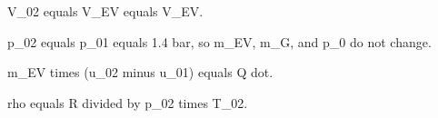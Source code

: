 V_02 equals V_EV equals V_EV.

p_02 equals p_01 equals 1.4 bar, so m_EV, m_G, and p_0 do not change.

m_EV times (u_02 minus u_01) equals Q dot.

rho equals R divided by p_02 times T_02.